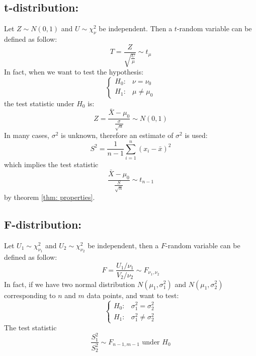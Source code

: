 \documentclass[11pt]{article}
\begin{document}
\subsection{t-distribution: }
Let $Z \sim N(0, 1)$ and $U \sim \chi_\nu^2$ be independent. Then a $t$-random variable can be defined as follow:
$$T = \dfrac{Z}{\sqrt{\frac{U}{\mu}}}  \sim t_{\mu}$$ 
In fact, when we want to test the hypothesis:
$$\begin{cases}
	H_0: & \nu = \nu_0 \\ H_1: & \mu \neq \mu_0
\end{cases} $$
the test statistic under $H_0$ is: 
$$Z = \dfrac{\bar{X} - \mu_0}{\frac{\sigma}{\sqrt{n}}} \sim N(0, 1) $$ In many cases,  $\sigma^2$ is unknown, therefore an estimate of $\sigma^2$ is used:
$$S^2 = \dfrac{1}{n - 1} \sum_{i = 1}^n (x_i - \bar{x})^2 $$
which implies the test statistic 
$$\dfrac{\bar{X} - \mu_0}{\frac{S}{\sqrt{n}}}  \sim t_{n - 1}$$ by theorem  \ref{thm: properties}.

\subsection{F-distribution: } 
Let $U_1 \sim \chi^2_{\nu_1}$ and $U_2\sim \chi^2_{\nu_2} $ be independent, then a $F$-random variable can be defined as follow:
$$F = \dfrac{U_1/ \nu_1}{V_2 / \nu_2}  \sim F_{\nu_1, \nu_2}$$
In fact, if we have  two normal distribution $N(\mu_1, \sigma_1^2)$ and $N(\mu_1, \sigma_2^2)$ corresponding to $n$ and $m$ data points, and want to test: 
$$\begin{cases}
	H_0: & \sigma_1^2 = \sigma_2^2 \\ H_1: & \sigma_1^2 \neq \sigma_2^2
\end{cases} $$
The test statistic 
$$ \dfrac{S_1^2}{S_2^2} \sim F_{n-1, m - 1} \text{ under } H_0$$ 

	\newpage
	
	
	
\end{document}
